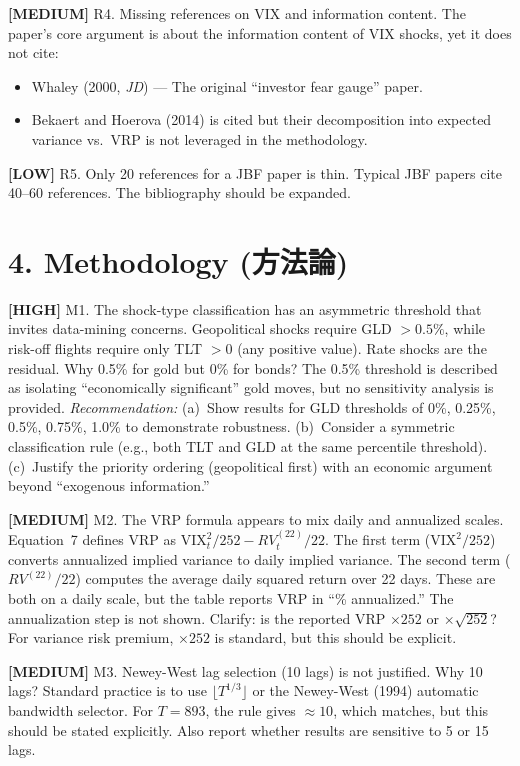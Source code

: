 \documentclass[12pt,a4paper]{article}
\newcommand{\high}[1]{\textcolor{errorred}{\textbf{[HIGH]} #1}}
\newcommand{\med}[1]{\textcolor{warncolor}{\textbf{[MEDIUM]} #1}}
\newcommand{\low}[1]{\textcolor{okgreen}{\textbf{[LOW]} #1}}
\begin{document}
\med{R4. Missing references on VIX and information content.} The paper's core argument is about the information content of VIX shocks, yet it does not cite:
\begin{itemize}[nosep]
\item Whaley (2000, \textit{JD}) --- The original ``investor fear gauge'' paper.
\item Bekaert and Hoerova (2014) is cited but their decomposition into expected variance vs.\ VRP is not leveraged in the methodology.
\end{itemize}

\low{R5. Only 20 references for a JBF paper is thin.} Typical JBF papers cite 40--60 references. The bibliography should be expanded.

\section*{4. Methodology (方法論)}

\high{M1. The shock-type classification has an asymmetric threshold that invites data-mining concerns.} Geopolitical shocks require GLD $> 0.5\%$, while risk-off flights require only TLT $> 0$ (any positive value). Rate shocks are the residual. Why 0.5\% for gold but 0\% for bonds? The 0.5\% threshold is described as isolating ``economically significant'' gold moves, but no sensitivity analysis is provided. \emph{Recommendation:} (a)~Show results for GLD thresholds of 0\%, 0.25\%, 0.5\%, 0.75\%, 1.0\% to demonstrate robustness. (b)~Consider a symmetric classification rule (e.g., both TLT and GLD at the same percentile threshold). (c)~Justify the priority ordering (geopolitical first) with an economic argument beyond ``exogenous information.''

\med{M2. The VRP formula appears to mix daily and annualized scales.} Equation~7 defines VRP as $\text{VIX}_t^2 / 252 - RV_t^{(22)} / 22$. The first term ($\text{VIX}^2/252$) converts annualized implied variance to daily implied variance. The second term ($RV^{(22)}/22$) computes the average daily squared return over 22 days. These are both on a daily scale, but the table reports VRP in ``\% annualized.'' The annualization step is not shown. Clarify: is the reported VRP $\times 252$ or $\times \sqrt{252}$? For variance risk premium, $\times 252$ is standard, but this should be explicit.

\med{M3. Newey-West lag selection (10 lags) is not justified.} Why 10 lags? Standard practice is to use $\lfloor T^{1/3} \rfloor$ or the Newey-West (1994) automatic bandwidth selector. For $T = 893$, the rule gives $\approx 10$, which matches, but this should be stated explicitly. Also report whether results are sensitive to 5 or 15 lags.
\end{document}
